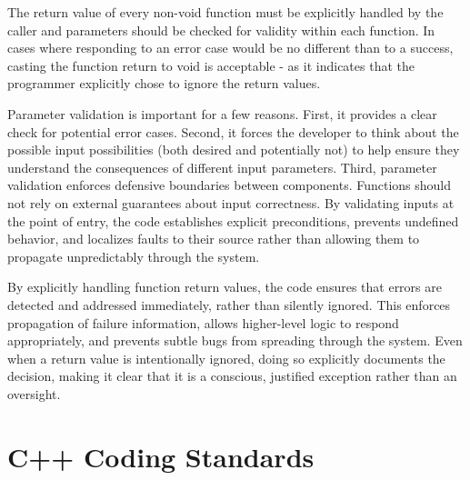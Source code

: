 The return value of every non-void function must be explicitly handled by the caller and parameters should be checked for validity within each function. In cases where responding to an error case would be no different than to a success, casting the function return to void is acceptable - as it indicates that the programmer explicitly chose to ignore the return values.

Parameter validation is important for a few reasons. First, it provides a clear check for potential error cases. Second, it forces the developer to think about the possible input possibilities (both desired and potentially not) to help ensure they understand the consequences of different input parameters. Third, parameter validation enforces defensive boundaries between components. Functions should not rely on external guarantees about input correctness. By validating inputs at the point of entry, the code establishes explicit preconditions, prevents undefined behavior, and localizes faults to their source rather than allowing them to propagate unpredictably through the system. 

By explicitly handling function return values, the code ensures that errors are detected and addressed immediately, rather than silently ignored. This enforces propagation of failure information, allows higher-level logic to respond appropriately, and prevents subtle bugs from spreading through the system. Even when a return value is intentionally ignored, doing so explicitly documents the decision, making it clear that it is a conscious, justified exception rather than an oversight.











\section{C++ Coding Standards}

